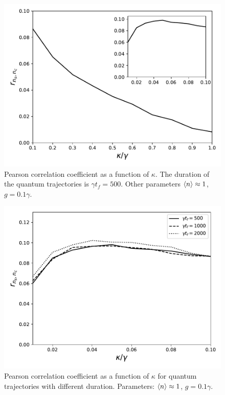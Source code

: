 \documentclass[%
 reprint,
 amsmath,amssymb,
 aps, 
]{revtex4-1}
\begin{document}
\begin{center}
\begin{figure}[t!]
\begin{center}
\includegraphics[scale = 0.5]{million1.pdf}
\caption{Pearson correlation coefficient as a function of $\kappa$.
  The duration of the quantum trajectories is  $\gamma t_f = 500$.
  Other parameters $\expval{n} \approx 1$, $g = 0.1\gamma$.} \label{corrxy}
\end{center}  
\end{figure}
\end{center}

\begin{center}
\begin{figure}[h!]
\begin{center}
\includegraphics[scale = 0.5]{million2.pdf}
\caption{Pearson correlation coefficient as a function of $\kappa$ for
  quantum trajectories with different duration. Parameters:
  $\expval{n} \approx 1$, $g = 0.1\gamma$.} \label{errorzz}
\end{center}
\end{figure}
\end{center}
\end{document}
